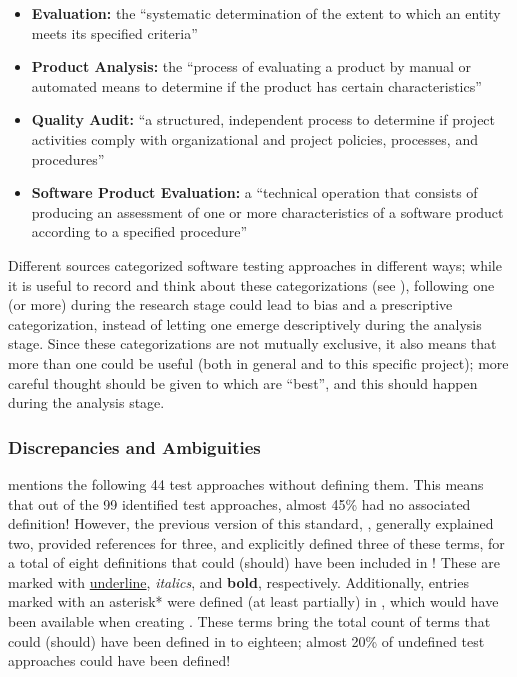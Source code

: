 \begin{itemize}
      \item \textbf{Evaluation:} the ``systematic determination of the extent
            to which an entity meets its specified criteria''
            \citep[p.~167]{IEEE2017}
      \item \textbf{Product Analysis:} the ``process of evaluating a product by
            manual or automated means to determine if the product has certain
            characteristics'' \citep[p.~343]{IEEE2017}
      \item \textbf{Quality Audit:} ``a structured, independent process to
            determine if project activities comply with organizational and
            project policies, processes, and procedures'' \citep[p.~361]{IEEE2017}
      \item \textbf{Software Product Evaluation:} a ``technical operation that
            consists of producing an assessment of one or more characteristics
            of a software product according to a specified procedure''
            \citep[p.~424]{IEEE2017}
\end{itemize}

Different sources categorized software testing approaches in different ways;
while it is useful to record and think about these categorizations (see
), following one (or more) during the research
stage could lead to bias and a prescriptive categorization, instead of letting
one emerge descriptively during the analysis stage. Since these categorizations
are not mutually exclusive, it also means that more than one could be useful
(both in general and to this specific project); more careful thought should be
given to which are ``best'', and this should happen during the analysis stage.

\subsubsection{Discrepancies and Ambiguities}

\citet{IEEE2022} mentions the following 44 test approaches without defining them.
This means that out of the 99 identified test approaches, almost 45\% had no
associated definition!
However, the previous version of this standard, \citep{IEEE2013}, generally
explained two, provided references for three, and explicitly defined three of
these terms, for a total of eight definitions that could (should) have been
included in \citep{IEEE2022}! These are marked with \underline{underline},
\emph{italics}, and \textbf{bold}, respectively. Additionally, entries marked
with an asterisk* were defined (at least partially) in \citep{IEEE2017}, which
would have been available when creating \citep{IEEE2022}. These terms bring the
total count of terms that could (should) have been defined in \citep{IEEE2022}
to eighteen; almost 20\% of undefined test approaches could have been defined!

